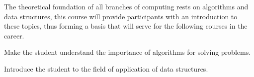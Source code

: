 \begin{syllabus}


\begin{justification}
The theoretical foundation of all branches of computing rests on algorithms and data structures, this course will provide participants with an introduction to these topics, thus forming a basis that will serve for the following courses in the career.
\end{justification}

\begin{goals}
\item Make the student understand the importance of algorithms for solving problems.
\item Introduce the student to the field of application of data structures.
\end{goals}

\begin{outcomes}
    \item {}
    \item {}
    \item {}
    \item {}
    \item {}
\end{outcomes}

\begin{competences}
    \item {} 
    \item {}
    \item {}
    \item {}
    \item {}
    \item {}
    
\end{competences}


\end{syllabus}

